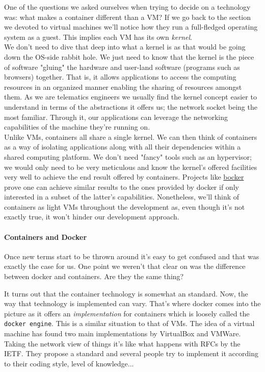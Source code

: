                 One of the questions we asked ourselves when trying to decide on a technology was: what makes a container different than a VM? If we go back to the section we devoted to virtual machines we'll notice how they run a full-fledged operating system as a guest. This implies each VM has its own \textit{kernel}.\\

                We don't need to dive that deep into what a kernel is as that would be going down the OS-side rabbit hole. We just need to know that the kernel is the piece of software "gluing" the hardware and user-land software (programs such as browsers) together. That is, it allows applications to access the computing resources in an organized manner enabling the sharing of resources amongst them. As we are telematics engineers we usually find the kernel concept easier to understand in terms of the abstractions it offers us; the network socket being the most familiar. Through it, our applications can leverage the networking capabilities of the machine they're running on.\\

                Unlike VMs, containers all share a single kernel. We can then think of containers as a way of isolating applications along with all their dependencies within a shared computing platform. We don't need "fancy" tools such as an hypervisor; we would only need to be very meticulous and know the kernel's offered facilities very well to achieve the end result offered by containers. Projects like \href{https://github.com/p8952/bocker}{bocker} prove one can achieve similar results to the ones provided by docker if only interested in a subset of the latter's capabilities. Nonetheless, we'll think of containers as light VMs throughout the development as, even though it's not exactly true, it won't hinder our development approach.\\

                \paragraph{Containers and Docker}
                    Once new terms start to be thrown around it's easy to get confused and that was exactly the case for us. One point we weren't that clear on was the difference between docker and containers. Are they the same thing?

                    It turns out that the container technology is somewhat an standard. Now, the way that technology is implemented can vary. That's where docker comes into the picture as it offers an \textit{implementation} for containers which is loosely called the \texttt{docker engine}. This is a similar situation to that of VMs. The idea of a virtual machine has found two main implementations by VirtualBox and VMWare. Taking the network view of things it's like what happens with RFCs by the IETF. They propose a standard and several people try to implement it according to their coding style, level of knowledge...

